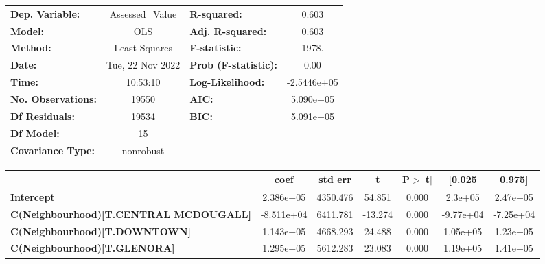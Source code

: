\documentclass{report}
\begin{document}
\begin{center}
\begin{tabular}{lclc}
\toprule
\textbf{Dep. Variable:}                        & Assessed\_Value  & \textbf{  R-squared:         } &      0.603   \\
\textbf{Model:}                                &       OLS        & \textbf{  Adj. R-squared:    } &      0.603   \\
\textbf{Method:}                               &  Least Squares   & \textbf{  F-statistic:       } &      1978.   \\
\textbf{Date:}                                 & Tue, 22 Nov 2022 & \textbf{  Prob (F-statistic):} &      0.00    \\
\textbf{Time:}                                 &     10:53:10     & \textbf{  Log-Likelihood:    } & -2.5446e+05  \\
\textbf{No. Observations:}                     &       19550      & \textbf{  AIC:               } &  5.090e+05   \\
\textbf{Df Residuals:}                         &       19534      & \textbf{  BIC:               } &  5.091e+05   \\
\textbf{Df Model:}                             &          15      & \textbf{                     } &              \\
\textbf{Covariance Type:}                      &    nonrobust     & \textbf{                     } &              \\
\bottomrule
\end{tabular}
\begin{tabular}{lcccccc}
                                               & \textbf{coef} & \textbf{std err} & \textbf{t} & \textbf{P$> |$t$|$} & \textbf{[0.025} & \textbf{0.975]}  \\
\midrule
\textbf{Intercept}                             &    2.386e+05  &     4350.476     &    54.851  &         0.000        &      2.3e+05    &     2.47e+05     \\
\textbf{C(Neighbourhood)[T.CENTRAL MCDOUGALL]} &   -8.511e+04  &     6411.781     &   -13.274  &         0.000        &    -9.77e+04    &    -7.25e+04     \\
\textbf{C(Neighbourhood)[T.DOWNTOWN]}          &    1.143e+05  &     4668.293     &    24.488  &         0.000        &     1.05e+05    &     1.23e+05     \\
\textbf{C(Neighbourhood)[T.GLENORA]}           &    1.295e+05  &     5612.283     &    23.083  &         0.000        &     1.19e+05    &     1.41e+05     \\

\end{tabular}
\end{center}
\end{document}
